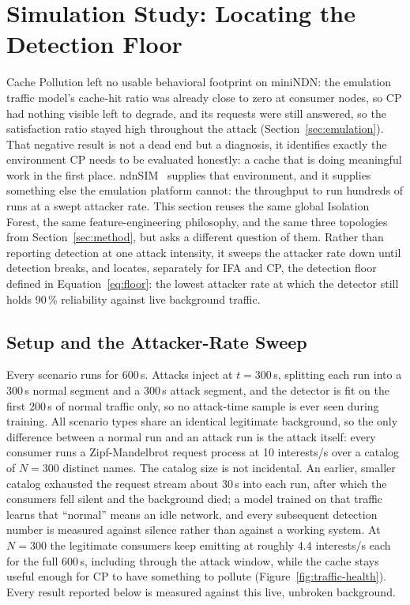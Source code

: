\section{Simulation Study: Locating the Detection Floor}
\label{sec:simulation}

Cache Pollution left no usable behavioral footprint on miniNDN: the emulation traffic model's cache-hit ratio was already close to zero at consumer nodes, so CP had nothing visible left to degrade, and its requests were still answered, so the satisfaction ratio stayed high throughout the attack (Section~\ref{sec:emulation}). That negative result is not a dead end but a diagnosis, it identifies exactly the environment CP needs to be evaluated honestly: a cache that is doing meaningful work in the first place. ndnSIM~\cite{mastorakis2015ndnsim} supplies that environment, and it supplies something else the emulation platform cannot: the throughput to run hundreds of runs at a swept attacker rate. This section reuses the same global Isolation Forest, the same feature-engineering philosophy, and the same three topologies from Section~\ref{sec:method}, but asks a different question of them. Rather than reporting detection at one attack intensity, it sweeps the attacker rate down until detection breaks, and locates, separately for IFA and CP, the detection floor defined in Equation~\ref{eq:floor}: the lowest attacker rate at which the detector still holds 90\,\% reliability against live background traffic.

\subsection{Setup and the Attacker-Rate Sweep}

Every scenario runs for 600\,s. Attacks inject at $t = 300$\,s, splitting each run into a 300\,s normal segment and a 300\,s attack segment, and the detector is fit on the first 200\,s of normal traffic only, so no attack-time sample is ever seen during training. All scenario types share an identical legitimate background, so the only difference between a normal run and an attack run is the attack itself: every consumer runs a Zipf-Mandelbrot request process at 10 interests/s over a catalog of $N = 300$ distinct names. The catalog size is not incidental. An earlier, smaller catalog exhausted the request stream about 30\,s into each run, after which the consumers fell silent and the background died; a model trained on that traffic learns that ``normal'' means an idle network, and every subsequent detection number is measured against silence rather than against a working system. At $N = 300$ the legitimate consumers keep emitting at roughly 4.4 interests/s each for the full 600\,s, including through the attack window, while the cache stays useful enough for CP to have something to pollute (Figure~\ref{fig:traffic-health}). Every result reported below is measured against this live, unbroken background.

